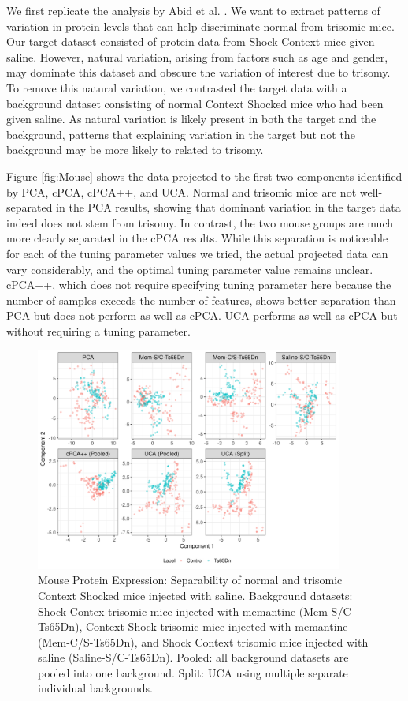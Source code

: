 \documentclass[12pt]{article}
\begin{document}
We first replicate the analysis by Abid et al. \cite{Abid}. We want to extract patterns of variation in protein levels that can help discriminate normal from trisomic mice. Our target dataset consisted of protein data from Shock Context mice given saline. However, natural variation, arising from factors such as age and gender, may dominate this dataset and obscure the variation of interest due to trisomy. To remove this natural variation, we contrasted the target data with a background dataset consisting of normal Context Shocked mice who had been given saline. As natural variation is likely present in both the target and the background, patterns that explaining variation in the target but not the background may be more likely to related to trisomy.

Figure \ref{fig:Mouse} shows the data projected to the first two components identified by PCA, cPCA, cPCA++, and UCA. Normal and trisomic mice are not well-separated in the PCA results, showing that dominant variation in the target data indeed does not stem from trisomy. In contrast, the two mouse groups are much more clearly separated in the cPCA results. While this separation is noticeable for each of the tuning parameter values we tried, the actual projected data can vary considerably, and the optimal tuning parameter value remains unclear.
cPCA++, which does not require specifying tuning parameter here because the number of samples exceeds the number of features, shows better separation than PCA but does not perform as well as cPCA. UCA performs as well as cPCA but without requiring a tuning parameter.

\begin{figure}[th!]
  \centering
  \includegraphics[width = 0.9\textwidth]{figure/Mouse_split_stack_Ts65Dn.png}
  \caption{Mouse Protein Expression: Separability of normal and trisomic Context Shocked mice injected with saline. Background datasets: Shock Contex trisomic mice injected with memantine (Mem-S/C-Ts65Dn), Context Shock trisomic mice injected with memantine (Mem-C/S-Ts65Dn), and Shock Context trisomic mice injected with saline (Saline-S/C-Ts65Dn). Pooled: all background datasets are pooled into one background. Split: UCA using multiple separate individual backgrounds.}
  \label{fig:MouseSplitStack}
\end{figure}
\end{document}
